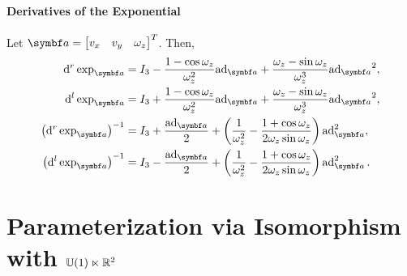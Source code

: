 \begin{properties}[breakable, title={$\SEtwo$ formula sheet}]
  \paragraph{Derivatives of the Exponential} Let $\a =\begin{bmatrix} v_x & v_y & \omega_z \end{bmatrix}^T$. Then,
  \begin{align}
    \mathrm{d}^r \exp_{\a}                     & =        I_3 - \frac{1 - \cos \omega_z}{\omega_z^2} {\ad_\a} + \frac{ \omega_z - \sin \omega_z }{\omega_z^3} {\ad_\a}^2,       \\
    \mathrm{d}^l \exp_{\a}                     & = I_3 + \frac{1 - \cos \omega_z}{\omega_z^2} {\ad_\a} + \frac{ \omega_z - \sin \omega_z }{\omega_z^3} {\ad_\a}^2,              \\
    \left( \mathrm{d}^r \exp_{\a} \right)^{-1} & = I_3 + \frac{\ad_\a}{2} + \left( \frac{1}{\omega_z^2} - \frac{1 + \cos \omega_z }{2 \omega_z \sin \omega_z} \right) \ad_\a^2, \\
    \left( \mathrm{d}^l \exp_{\a} \right)^{-1} & = I_3 - \frac{\ad_\a}{2} + \left( \frac{1}{\omega_z^2} - \frac{1 + \cos \omega_z }{2 \omega_z \sin \omega_z} \right) \ad_\a^2.
  \end{align}
\end{properties}

\section{Parameterization via Isomorphism with \texorpdfstring{${\mathbb{U}(1)} \ltimes \mathbb{R}^{2}$}{U(1) |x R2}}

